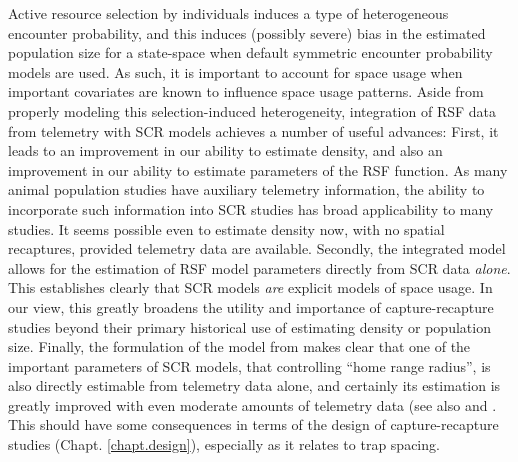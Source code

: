 Active resource selection by individuals  
induces a type of heterogeneous encounter probability, and this
induces (possibly severe) bias in the estimated population size for a
state-space when default symmetric
encounter probability models are used.
As such, it is important to account for space usage when important
covariates are known to influence space usage patterns.
Aside from properly modeling this selection-induced heterogeneity, integration of RSF data from telemetry with SCR models achieves a
number of useful advances:
First, it
leads to an improvement in our ability to estimate density,
and also an improvement in our ability to estimate parameters of the
RSF function.  As many animal population studies have auxiliary
telemetry information, the ability to incorporate such information
into SCR studies has broad applicability to many studies.  It seems
possible even to estimate density now, with no spatial recaptures,
provided telemetry data are available.  
Secondly, 
the integrated model
allows for the estimation of RSF model parameters directly from SCR
data {\it alone}.  This establishes clearly that SCR models {\it are}
explicit models of space usage. In our view, this greatly broadens the
utility and importance of capture-recapture studies beyond their
primary historical use of estimating density or population
size. Finally, the formulation of the model from \citet{royle_etal:2012mee}
makes clear that one of the important parameters of SCR
models, that controlling ``home range radius'', is also directly
estimable from telemetry data alone, and certainly its estimation is
greatly improved with even moderate amounts of telemetry data (see
also \citet{sollmann_etal:2012ecol} and \citet{sollmann_etal:inprepjapplecol}. 
This should have some consequences in terms of the design of capture-recapture
studies (Chapt. \ref{chapt.design}), especially as it relates to trap spacing.

